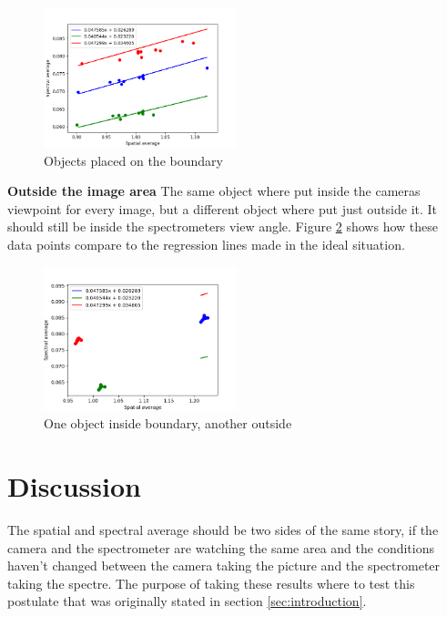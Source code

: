 \begin{figure}[h]
    \centering
    \includegraphics[width=0.5\textwidth]{Plots/spectral_vs_spatial_average_with_regression_boundary_objects.png}
    \caption{Objects placed on the boundary}
    \label{fig:boundary_objects_plot}
\end{figure}

\textbf{Outside the image area}
The same object where put inside the cameras viewpoint for every image, but a different object where put just outside it. It should still be inside the spectrometers view angle. Figure \ref{fig:outside_objects_plot} shows how these data points compare to the regression lines made in the ideal situation.

\begin{figure}[h]
    \centering
    \includegraphics[width=0.5\textwidth]{Plots/spectral_vs_spatial_average_with_regression_outside_objects.png}
    \caption{One object inside boundary, another outside}
    \label{fig:outside_objects_plot}
\end{figure}


\section{Discussion}
The spatial and spectral average should be two sides of the same story, if the camera and the spectrometer are watching the same area and the conditions haven't changed between the camera taking the picture and the spectrometer taking the spectre. The purpose of taking these results where to test this postulate that was originally stated in section \ref{sec:introduction}.

